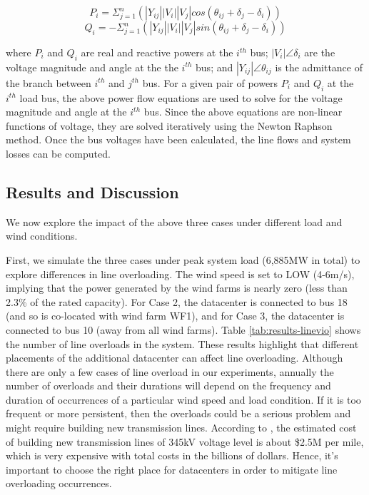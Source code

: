 \begin{equation}
P_{i} = \Sigma_{j=1}^{n}(|Y_{ij}||V_{i}||V_{j}|cos(\theta_{ij}+\delta_{j}-\delta_{i}))
\end{equation}
\begin{equation}
Q_{i} = -\Sigma_{j=1}^{n}(|Y_{ij}||V_{i}||V_{j}|sin(\theta_{ij}+\delta_{j}-\delta_{i}))
\end{equation}

\noindent where $P_{i}$ and $Q_{i}$ are real and reactive powers at
the $i^{th}$ bus; $|V_{i}|\angle \delta_{i}$ are the voltage magnitude
and angle at the the $i^{th}$ bus; and $|Y_{ij}|\angle \theta_{ij}$ is
the admittance of the branch between $i^{th}$ and $j^{th}$ bus.  For a
given pair of powers $P_{i}$ and $Q_{i}$ at the $i^{th}$ load bus, the
above power flow equations are used to solve for the voltage magnitude
and angle at the $i^{th}$ bus. Since the above equations are
non-linear functions of voltage, they are solved iteratively using the
Newton Raphson method. Once the bus voltages have been calculated, the
line flows and system losses can be computed.

\subsection{Results and Discussion}

We now explore the impact of the above three cases under different
load and wind conditions.

First, we simulate the three cases under peak system load (6,885MW in
total) to explore differences in line overloading.  The wind speed is
set to LOW (4-6m/s), implying that the power generated by the wind
farms is nearly zero (less than 2.3\% of the rated capacity).  For
Case 2, the datacenter is connected to bus 18 (and so is co-located
with wind farm WF1), and for Case 3, the datacenter is connected to
bus 10 (away from all wind farms).  Table \ref{tab:results-linevio}
shows the number of line overloads in the system.  These results
highlight that different placements of the additional datacenter can
affect line overloading.  Although there are only a few cases of
line overload in our experiments, annually the number of overloads and
their durations will depend on the frequency and duration of
occurrences of a particular wind speed and load condition. If it is
too frequent or more persistent, then the overloads could be a serious
problem and might require building new transmission lines. According
to \cite{interconnection2010survey}, the estimated cost of building
new transmission lines of 345kV voltage level is about \$2.5M
per mile, which is very expensive with total costs in the billions
of dollars. Hence, it's important to choose the right place for
datacenters in order to mitigate line overloading occurrences.

